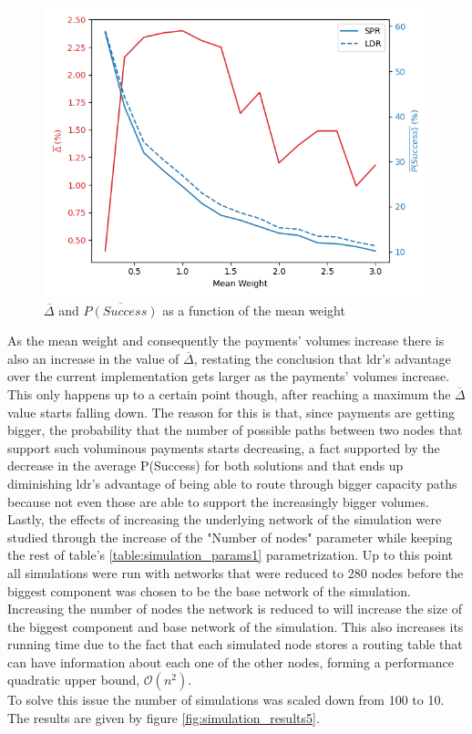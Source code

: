 \begin{figure}[H]
\begin{center}
  \includegraphics[width=\linewidth]{images/simulation_results4.png}
  \caption{$\overline{\Delta}$ and  $\overline{P(Success)}$ as a function of the mean weight}
  \label{fig:simulation_results4}
  \end{center}
\end{figure}

As the mean weight and consequently the payments' volumes increase there is also an increase in the value of $\overline{\Delta}$, restating the conclusion that \acrshort{ldr}'s advantage over the current implementation gets larger as the payments' volumes increase. This only happens up to a certain point though, after reaching a maximum the $\overline{\Delta}$ value starts falling down. The reason for this is that, since payments are getting bigger, the probability that the number of possible paths between two nodes that support such voluminous payments starts decreasing, a fact supported by the decrease in the average P(Success) for both solutions and that ends up diminishing \acrshort{ldr}'s advantage of being able to route through bigger capacity paths because not even those are able to support  the increasingly bigger volumes.\\
Lastly, the effects of increasing the underlying network of the simulation were studied through the increase of the "Number of nodes" parameter while keeping the rest of table's \ref{table:simulation_params1} parametrization. Up to this point all simulations were run with networks that were reduced to 280 nodes before the biggest component was chosen to be the base network of the simulation. Increasing the number of nodes the network is reduced to will increase the size of the biggest component and base network of the simulation. This also increases its running time due to the fact that each simulated node stores a routing table that can have information about each one of the other nodes, forming a performance quadratic upper bound, $\mathcal{O}(n^2)$.\\
To solve this issue the number of simulations was scaled down from 100 to 10. The results are given by figure \ref{fig:simulation_results5}.\\

